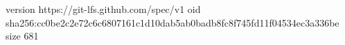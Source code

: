 version https://git-lfs.github.com/spec/v1
oid sha256:cc0be2c2e72c6c6807161c1d10dab5ab0badb8fc8f745fd11f04534ec3a336be
size 681

